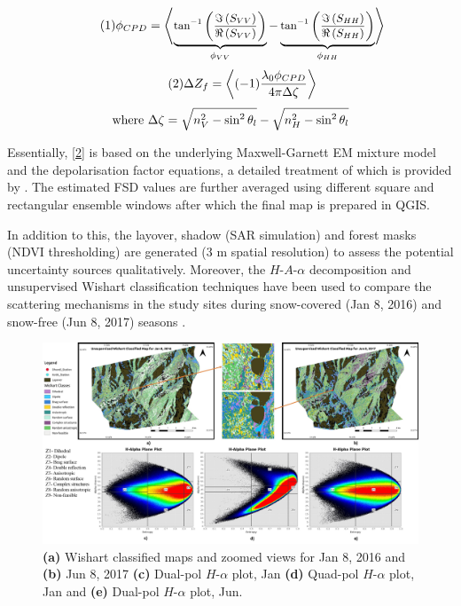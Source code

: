\documentclass{article}
\begin{document}
\begin{equation}\tag{1}
    \centering
    \small{\phi_{CPD} =\left\langle\underbrace{\tan^{-1}\left(\frac{\Im\left(S_{VV}\right)}{\Re\left(S_{VV}\right)}\right)}_{\phi_{VV}} - \underbrace{\tan^{-1}\left(\frac{\Im\left(S_{HH}\right)}{\Re\left(S_{HH}\right)}\right)}_{\phi_{HH}}\right\rangle}
    \label{1}
\end{equation}
\begin{equation}\tag{2}
    \centering
    \small{\Delta{Z_f} = \left\langle(-1)\frac{\lambda_0\phi_{CPD}}{4\pi\Delta{\zeta}} \right\rangle}
    \label{2}
\end{equation}
\begin{equation*}
    \centering
    \text{where } \small{\Delta{\zeta} = \sqrt{n^2_V - \sin^{2}\theta_l} - \sqrt{n^2_H - \sin^{2}\theta_l}}
\end{equation*}

Essentially, \eqref{2} is based on the underlying Maxwell-Garnett EM mixture model and the depolarisation factor equations, a detailed treatment of which is provided by \cite{Sihvola1999}. The estimated FSD values are further averaged using different square and rectangular ensemble windows after which the final map is prepared in QGIS.

In addition to this, the layover, shadow (SAR simulation) and forest masks (NDVI thresholding) are generated (3 m spatial resolution) to assess the potential uncertainty sources qualitatively. Moreover, the $H$-$A$-$\alpha$ decomposition and unsupervised Wishart classification techniques have been used to compare the scattering mechanisms in the study sites during snow-covered (Jan 8, 2016) and snow-free (Jun 8, 2017) seasons \cite{Singh2014}.
\begin{figure}[htb]
    \centering
    \includegraphics[scale=0.144]{Pictures/All_Wishart_New.jpg}
    \caption{\textbf{(a)} Wishart classified maps and zoomed views for Jan 8, 2016 and \textbf{(b)} Jun 8, 2017 \textbf{(c)} Dual-pol $H$-$\alpha$ plot, Jan \textbf{(d)} Quad-pol $H$-$\alpha$ plot, Jan and \textbf{(e)} Dual-pol $H$-$\alpha$ plot, Jun.}
    \label{fig:wishart}
\end{figure}
\end{document}
